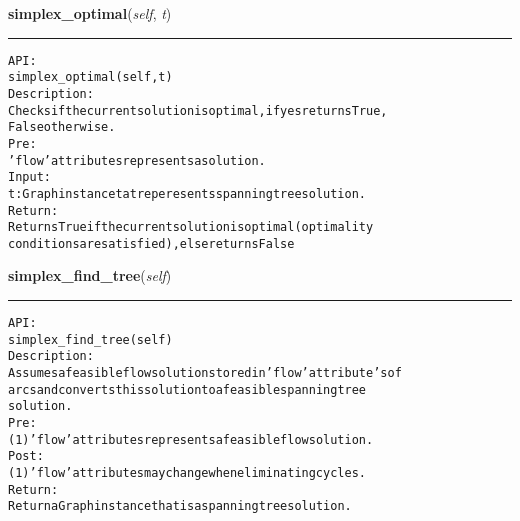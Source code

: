     \label{coinor:gimpy:graph:Graph:simplex_optimal}

    \vspace{0.5ex}

\hspace{.8\funcindent}\begin{boxedminipage}{\funcwidth}

    \raggedright \textbf{simplex\_optimal}(\textit{self}, \textit{t})

    \vspace{-1.5ex}

    \rule{\textwidth}{0.5\fboxrule}
\setlength{\parskip}{2ex}
\begin{alltt}

API:
    simplex\_optimal(self, t)
Description:
    Checks if the current solution is optimal, if yes returns True,
    False otherwise.
Pre:
    'flow' attributes represents a solution.
Input:
    t: Graph instance tat reperesents spanning tree solution.
Return:
    Returns True if the current solution is optimal (optimality
    conditions are satisfied), else returns False
\end{alltt}

\setlength{\parskip}{1ex}
    \end{boxedminipage}

    \label{coinor:gimpy:graph:Graph:simplex_find_tree}

    \vspace{0.5ex}

\hspace{.8\funcindent}\begin{boxedminipage}{\funcwidth}

    \raggedright \textbf{simplex\_find\_tree}(\textit{self})

    \vspace{-1.5ex}

    \rule{\textwidth}{0.5\fboxrule}
\setlength{\parskip}{2ex}
\begin{alltt}

API:
    simplex\_find\_tree(self)
Description:
    Assumes a feasible flow solution stored in 'flow' attribute's of
    arcs and converts this solution to a feasible spanning tree
    solution.
Pre:
    (1) 'flow' attributes represents a feasible flow solution.
Post:
    (1) 'flow' attributes may change when eliminating cycles.
Return:
    Return a Graph instance that is a spanning tree solution.
\end{alltt}

\setlength{\parskip}{1ex}
    \end{boxedminipage}

